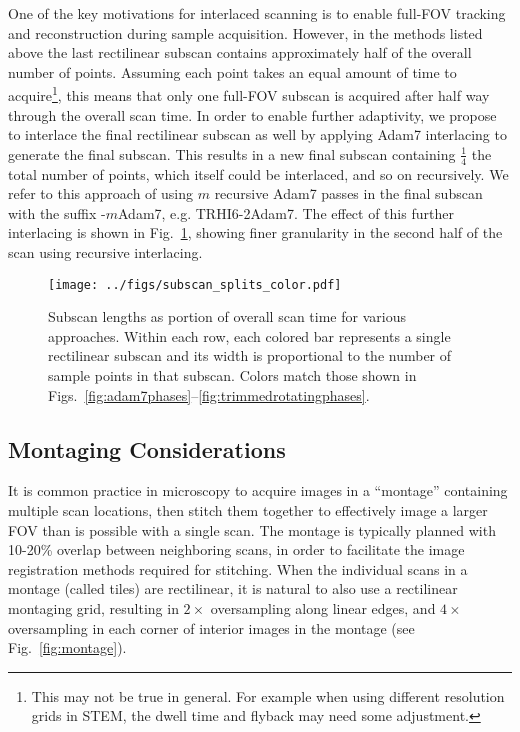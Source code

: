 \documentclass{article}
\newcommand{\reffig}[1]{Fig.~\ref{fig:#1}}
\begin{document}
One of the key motivations for interlaced scanning is to enable full-FOV
tracking and reconstruction during sample acquisition.
%
However, in the methods listed above the last rectilinear subscan contains approximately half of the overall number of points.
%
Assuming each point takes an equal amount of time to acquire\footnote{This may not be true in general. For example when using different resolution grids in STEM, the dwell time and flyback may need some adjustment.}, this means that only one full-FOV subscan is acquired after half way through the overall scan time.
%
In order to enable further adaptivity, we propose to interlace the final rectilinear subscan as well by applying Adam7 interlacing to generate the final subscan.
%
This results in a new final subscan containing $\frac{1}{4}$ the total number of points, which itself could be interlaced, and so on recursively.
%
We refer to this approach of using $m$ recursive Adam7 passes in the final subscan with the suffix -$m$Adam7, e.g. TRHI6-2Adam7.
%
The effect of this further interlacing is shown in \reffig{subscanlengths}, showing finer granularity in the second half of the scan using recursive interlacing.


\begin{figure}
\centering
\texttt{[image: ../figs/subscan\_splits\_color.pdf]}
\caption{
\label{fig:subscanlengths} 
Subscan lengths as portion of overall scan time for various approaches.
%
Within each row, each colored bar represents a single rectilinear subscan and its width is proportional to the number of sample points in that subscan.
%
    Colors match those shown in
    Figs.~\ref{fig:adam7phases}--\ref{fig:trimmedrotatingphases}.
}
\end{figure}


\subsection{Montaging Considerations}
\label{sec:montaging}

It is common practice in microscopy to acquire images in a
``montage'' containing multiple scan locations, then stitch them together to
effectively image a larger FOV than is possible with a single scan.
%
The montage is typically planned with 10-20\% overlap between neighboring scans,
in order to facilitate the image registration methods required for stitching.
%
When the individual scans in a montage (called tiles) are rectilinear, it is
natural to also use a rectilinear montaging grid, resulting in $2\times$ oversampling
along linear edges, and $4\times$ oversampling in each corner of interior images in
the montage (see \reffig{montage}).
%
\end{document}
